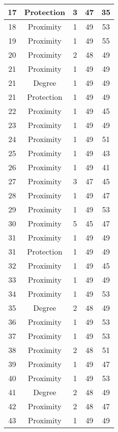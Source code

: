 \documentclass[results.tex]{subfiles}
\begin{document}
\begin{center}
\begin{tabular}{| c || c | c | c | c |}
    \hline
    17 & Protection & 3 & 47 & 35 \\ 
    \hline
    18 & Proximity & 1 & 49 & 53 \\ 
    \hline
    19 & Proximity & 1 & 49 & 55 \\ 
    \hline
    20 & Proximity & 2 & 48 & 49 \\ 
    \hline
    21 & Proximity & 1 & 49 & 49 \\ 
    \hline
    21 & Degree & 1 & 49 & 49 \\ 
    \hline
    21 & Protection & 1 & 49 & 49 \\ 
    \hline
    22 & Proximity & 1 & 49 & 45 \\ 
    \hline
    23 & Proximity & 1 & 49 & 49 \\ 
    \hline
    24 & Proximity & 1 & 49 & 51 \\ 
    \hline
    25 & Proximity & 1 & 49 & 43 \\ 
    \hline
    26 & Proximity & 1 & 49 & 41 \\ 
    \hline
    27 & Proximity & 3 & 47 & 45 \\ 
    \hline
    28 & Proximity & 1 & 49 & 47 \\ 
    \hline
    29 & Proximity & 1 & 49 & 53 \\ 
    \hline
    30 & Proximity & 5 & 45 & 47 \\ 
    \hline
    31 & Proximity & 1 & 49 & 49 \\ 
    \hline
    31 & Protection & 1 & 49 & 49 \\ 
    \hline
    32 & Proximity & 1 & 49 & 45 \\ 
    \hline
    33 & Proximity & 1 & 49 & 49 \\ 
    \hline
    34 & Proximity & 1 & 49 & 53 \\ 
    \hline
    35 & Degree & 2 & 48 & 49 \\ 
    \hline
    36 & Proximity & 1 & 49 & 53 \\ 
    \hline
    37 & Proximity & 1 & 49 & 53 \\ 
    \hline
    38 & Proximity & 2 & 48 & 51 \\ 
    \hline
    39 & Proximity & 1 & 49 & 47 \\ 
    \hline
    40 & Proximity & 1 & 49 & 53 \\ 
    \hline
    41 & Degree & 2 & 48 & 49 \\ 
    \hline
    42 & Proximity & 2 & 48 & 47 \\ 
    \hline
    43 & Proximity & 1 & 49 & 49 \\ 

\end{tabular}
\end{center}
\end{document}
